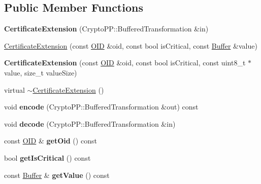 \subsection*{Public Member Functions}
\begin{DoxyCompactItemize}
\item 
{\bfseries Certificate\+Extension} (Crypto\+P\+P\+::\+Buffered\+Transformation \&in)\hypertarget{classndn_1_1CertificateExtension_a9d9f89e871d386248aec95bd6d1a10c5}{}\label{classndn_1_1CertificateExtension_a9d9f89e871d386248aec95bd6d1a10c5}

\item 
\hyperlink{classndn_1_1CertificateExtension_af06feb26061e8ce1631a761fc5964ca8}{Certificate\+Extension} (const \hyperlink{classndn_1_1OID}{O\+ID} \&oid, const bool is\+Critical, const \hyperlink{classndn_1_1Buffer}{Buffer} \&value)
\item 
{\bfseries Certificate\+Extension} (const \hyperlink{classndn_1_1OID}{O\+ID} \&oid, const bool is\+Critical, const uint8\+\_\+t $\ast$value, size\+\_\+t value\+Size)\hypertarget{classndn_1_1CertificateExtension_aa92e02de7a5d5f5cd189c98a7e52a14b}{}\label{classndn_1_1CertificateExtension_aa92e02de7a5d5f5cd189c98a7e52a14b}

\item 
virtual \hyperlink{classndn_1_1CertificateExtension_a75bfbaf7fb73bcc66eac2a6570da4ff2}{$\sim$\+Certificate\+Extension} ()
\item 
void {\bfseries encode} (Crypto\+P\+P\+::\+Buffered\+Transformation \&out) const\hypertarget{classndn_1_1CertificateExtension_ad42563f22a4c63559bac1f30232b16c9}{}\label{classndn_1_1CertificateExtension_ad42563f22a4c63559bac1f30232b16c9}

\item 
void {\bfseries decode} (Crypto\+P\+P\+::\+Buffered\+Transformation \&in)\hypertarget{classndn_1_1CertificateExtension_aa8cb052d806e7e9825b9fb6536339866}{}\label{classndn_1_1CertificateExtension_aa8cb052d806e7e9825b9fb6536339866}

\item 
const \hyperlink{classndn_1_1OID}{O\+ID} \& {\bfseries get\+Oid} () const\hypertarget{classndn_1_1CertificateExtension_af62a03daf0a77219396ee995d3110109}{}\label{classndn_1_1CertificateExtension_af62a03daf0a77219396ee995d3110109}

\item 
bool {\bfseries get\+Is\+Critical} () const\hypertarget{classndn_1_1CertificateExtension_ac774bb6ce160ca49093be4d32611951a}{}\label{classndn_1_1CertificateExtension_ac774bb6ce160ca49093be4d32611951a}

\item 
const \hyperlink{classndn_1_1Buffer}{Buffer} \& {\bfseries get\+Value} () const\hypertarget{classndn_1_1CertificateExtension_a2726ac915400b8ec6cb9941612edaf71}{}\label{classndn_1_1CertificateExtension_a2726ac915400b8ec6cb9941612edaf71}

\end{DoxyCompactItemize}
